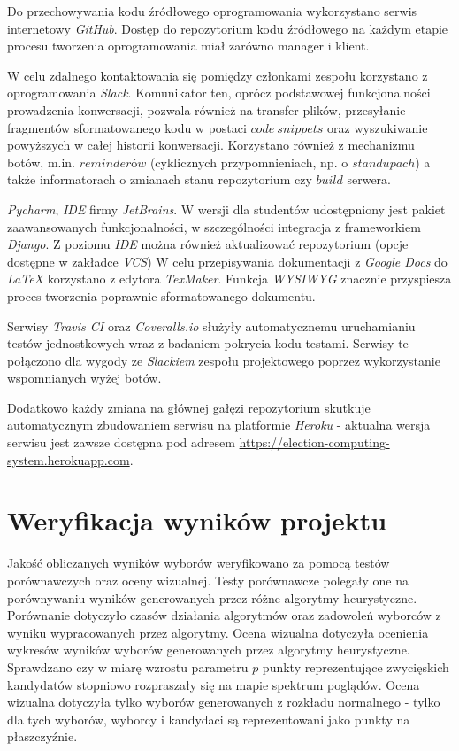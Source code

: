 \documentclass[pdflatex,11pt]{../aghdoc_version2}
\newlength\tindent
\renewcommand{\indent}{\hspace*{\tindent}}
\begin{document}
\indent Do przechowywania kodu źródłowego oprogramowania wykorzystano serwis internetowy
\textit{GitHub}. Dostęp do repozytorium kodu źródłowego na każdym etapie procesu tworzenia
oprogramowania miał zarówno manager i klient. 

\indent W celu zdalnego kontaktowania się pomiędzy członkami zespołu korzystano z
oprogramowania \textit{Slack}. Komunikator ten, oprócz podstawowej funkcjonalności prowadzenia
konwersacji, pozwala również na transfer plików, przesyłanie fragmentów sformatowanego
kodu w postaci $code \ snippets$ oraz wyszukiwanie powyższych w całej historii konwersacji.
Korzystano również z mechanizmu botów, m.in. $reminderów$ (cyklicznych przypomnieniach,
np. o $standupach$) a także informatorach o zmianach stanu repozytorium czy $build$ serwera.

\indent \textit{Pycharm}, \textit{IDE} firmy \textit{JetBrains}. W wersji dla studentów udostępniony jest pakiet
zaawansowanych funkcjonalności, w szczególności integracja z frameworkiem \textit{Django}. Z
poziomu \textit{IDE} można również aktualizować repozytorium (opcje dostępne w zakładce \textit{VCS})
W celu przepisywania dokumentacji z \textit{Google Docs} do \textit{LaTeX} korzystano z edytora
\textit{TexMaker}. Funkcja \textit{WYSIWYG} znacznie przyspiesza proces tworzenia poprawnie
sformatowanego dokumentu.

\indent Serwisy \textit{Travis CI} oraz \textit{Coveralls.io} służyły automatycznemu uruchamianiu testów jednostkowych wraz z badaniem pokrycia kodu testami. Serwisy te połączono dla wygody ze \textit{Slackiem} zespołu projektowego poprzez wykorzystanie wspomnianych wyżej botów.

\indent Dodatkowo każdy zmiana na głównej gałęzi repozytorium skutkuje automatycznym zbudowaniem serwisu na platformie \textit{Heroku} - aktualna wersja serwisu jest zawsze dostępna pod adresem  \url{https://election-computing-system.herokuapp.com}.

\section{Weryfikacja wyników projektu}
Jakość obliczanych wyników wyborów weryfikowano za pomocą testów
porównawczych oraz oceny wizualnej. Testy porównawcze polegały one na porównywaniu wyników generowanych przez różne
algorytmy heurystyczne. Porównanie dotyczyło czasów działania algorytmów oraz zadowoleń wyborców z wyniku wypracowanych przez algorytmy. Ocena wizualna dotyczyła ocenienia wykresów wyników wyborów generowanych przez algorytmy heurystyczne. Sprawdzano czy w miarę wzrostu parametru $p$ punkty reprezentujące zwycięskich kandydatów stopniowo rozpraszały się na mapie spektrum poglądów. Ocena wizualna dotyczyła tylko wyborów generowanych z rozkładu normalnego - tylko dla tych wyborów, wyborcy i kandydaci są reprezentowani jako punkty na płaszczyźnie.
\end{document}
